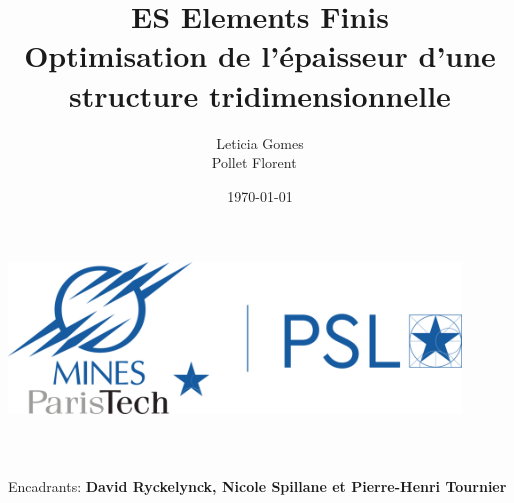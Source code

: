 \title{\Large ES Elements Finis  \\[0.5cm]
        \bf\Large Optimisation de l'épaisseur d'une structure tridimensionnelle}
\author{\large Leticia Gomes\\Pollet Florent \ \\}
\date{\large\today}

\makeatletter
    \begin{titlepage}
        \begin{center}
	   { \includegraphics[width=12cm]{imgs/mp_logo.png}}
	   {\ \\ \ \\}
        \vbox{}\vspace{5cm}
            {\@title }\\[3cm] 
            {\@author}
            {\large \ \\ Encadrants: \bf David Ryckelynck, Nicole Spillane et Pierre-Henri Tournier\\ \ \\}
            {\@date\\}

        \end{center}
    \end{titlepage}

    \tableofcontents

    \clearpage
\makeatother